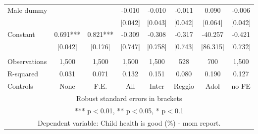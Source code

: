 \begin{tabular}{lccccccc}
Male dummy &  &  & -0.010 & -0.010 & -0.011 & 0.090 & -0.006 \\
 &  &  & [0.042] & [0.043] & [0.042] & [0.064] & [0.042] \\
Constant & 0.691*** & 0.821*** & -0.309 & -0.308 & -0.317 & -40.257 & -0.421 \\
 & [0.042] & [0.176] & [0.747] & [0.758] & [0.743] & [86.315] & [0.732] \\
 &  &  &  &  &  &  &  \\
Observations & 1,500 & 1,500 & 1,500 & 1,500 & 528 & 700 & 1,500 \\
R-squared & 0.031 & 0.071 & 0.132 & 0.151 & 0.080 & 0.190 & 0.127 \\
 Controls & None & F.E. & All & Inter & Reggio & Adol & no FE \\ \hline
\multicolumn{8}{c}{ Robust standard errors in brackets} \\
\multicolumn{8}{c}{ *** p$<$0.01, ** p$<$0.05, * p$<$0.1} \\
\multicolumn{8}{c}{ Dependent variable: Child health is good (\%) - mom report.} \\
\end{tabular}
